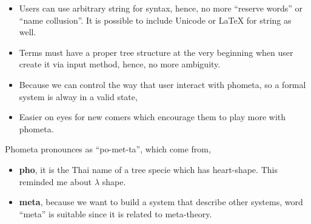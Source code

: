 \begin{itemize}
    \item Users can use arbitrary string for syntax, hence, no more ``reserve words'' or ``name collusion''. It is possible to include Unicode or LaTeX for string as well.
    \item Terms must have a proper tree structure at the very beginning when user create it via input method, hence, no more ambiguity.
    \item Because we can control the way that user interact with phometa, so a formal system is alway in a valid state,
    \item Easier on eyes for new comers which encourage them to play more with phometa.
\end{itemize}

Phometa pronounces as ``po-met-ta'', which come from,

\begin{itemize}
    \item \textbf{pho}, it is the Thai name of a tree specie which has heart-shape. This reminded me about $\lambda$ shape.
    \item \textbf{meta}, because we want to build a system that describe other systems, word ``meta'' is suitable since it is related to meta-theory.
\end{itemize}
